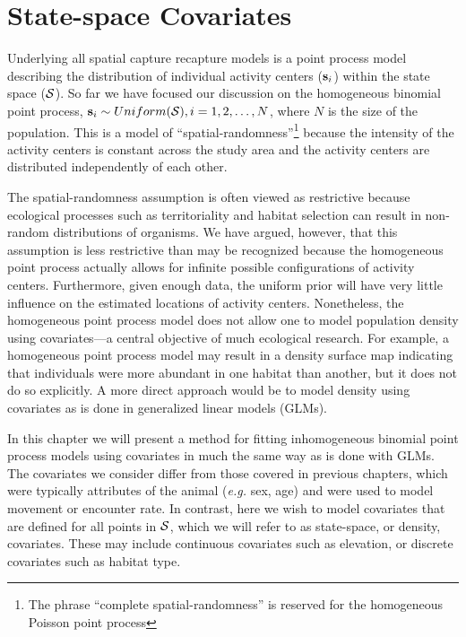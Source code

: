 


\chapter{State-space Covariates}
\label{chapt.state-space}

\vspace{0.3cm}

Underlying all spatial capture recapture models is a point process
model describing the distribution of individual activity
centers (${\bf s}_i$) within the state space ($\cal{S}$). So far we have focused our
discussion on the homogeneous binomial point process,
${\bf s}_i \sim Uniform({\cal S}), i=1,2,\dots,N$, where $N$ is the
size of the population. This is a model of
``spatial-randomness''\footnote{The phrase ``complete
  spatial-randomness'' is reserved for the homogeneous Poisson point
  process}
because the intensity of the
activity centers is constant across the study area and the activity
centers are distributed independently of each other.

The spatial-randomness assumption is often viewed as restrictive
because ecological processes such as
territoriality and habitat selection can result in non-random
distributions of organisms. We have argued, however, that this
assumption is less restrictive than may be recognized because the
homogeneous point process actually allows for infinite
possible configurations of activity centers. Furthermore, given enough data,
the uniform prior will have very little influence on the estimated
locations of activity centers. Nonetheless, the homogeneous point
process model does not allow one to model population density using
covariates---a central objective of much ecological research.
For example, a homogeneous point process model
may result in a density surface map indicating that individuals were
more abundant in one habitat than another, but it does not do so
explicitly. A more direct approach would be to model density using
covariates as is done in generalized linear models (GLMs).%

In this chapter we will present a method
for fitting inhomogeneous binomial point process models using
covariates in much the same way as is done with GLMs. The
covariates we consider differ
from those covered in previous chapters, which were typically
attributes of the animal ({\it e.g.} sex, age) and were used to model movement or encounter
rate. In contrast, here we wish to
model covariates that are defined for all points in
$\cal{S}$, which we will refer to as
state-space, or density, covariates. These may
include continuous covariates such as elevation, or discrete
covariates such as habitat type.

